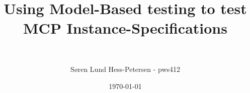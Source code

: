 \documentclass[a4paper,11pt,oneside]{memoir}
\begin{document}

\thesiscomment{} %
\title{Using Model-Based testing to test MCP Instance-Specifications}
\subtitle{~} %
\author{Søren Lund Hess-Petersen - pws412}
\date{\today} %

\pagestyle{plain}
\maketitle

\cleardoublepage
{}
\setcounter{page}{3}

\cleardoublepage
\pagestyle{plain}

\begin{abstract}
\end{abstract}

\begin{resume}
\end{resume}



\cleardoublepage
{}
\tableofcontents*

\cleardoublepage
{}
\setcounter{page}{1}







\end{document}
